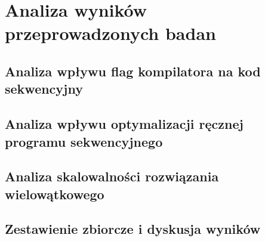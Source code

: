 \chapter{Analiza wyników przeprowadzonych badan}
\section{Analiza wpływu flag kompilatora na kod sekwencyjny}
\section{Analiza wpływu optymalizacji ręcznej programu sekwencyjnego}
\section{Analiza skalowalności rozwiązania wielowątkowego}
\section{Zestawienie zbiorcze i dyskusja wyników}